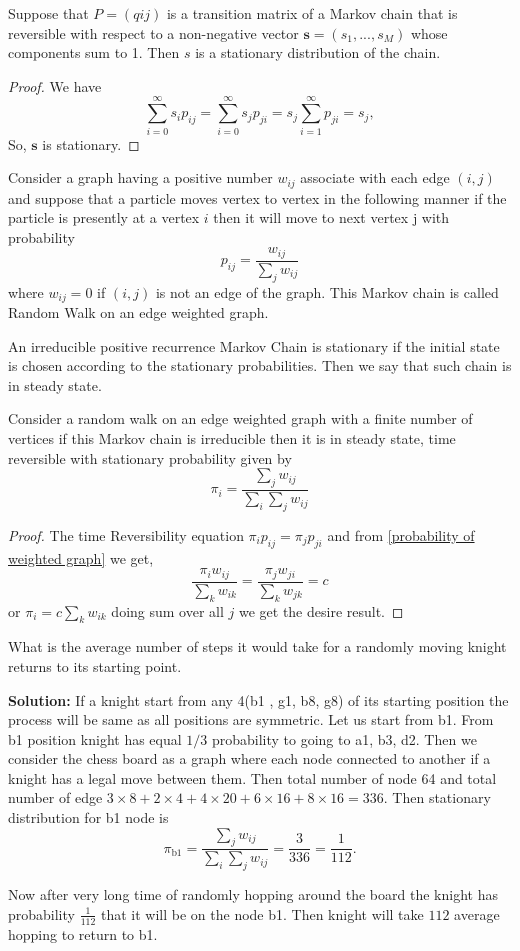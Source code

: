 \begin{proposition}
    Suppose that $P = (qij)$ is
a transition matrix of a Markov chain that is reversible with respect to a non-negative vector 
$\mathbf{s} = (s_1, . . . , s_M)$ whose components sum to 1. Then $s$ is a stationary distribution of the chain.
\end{proposition}
\begin{proof}
    We have 
    \[
        \sum_{i=0}^{\infty} s_{i}p_{ij} = \sum_{i=0}^{\infty} s_{j}p_{ji} = s_{j}\sum_{i=1}^{\infty} p_{ji} = s_{j},
    \]
    So, $ \mathbf{s} $ is stationary.
\end{proof}

Consider a graph having a positive number $ w_{ij} $ associate with each edge $ (i,j) $ and suppose that 
a particle moves vertex to vertex in the following manner if the particle is presently at a vertex  $ i $ then 
it will move to next vertex j with probability 
 \begin{equation}
    \label{probability of weighted graph}
    p_{ij} = \frac{w_{ij}}{\sum_j w_{ij}}
\end{equation}
where $ w_{ij} =0 $ if $ (i,j) $ is not an edge of the graph. This Markov chain is called 
Random Walk on an edge weighted graph.

An irreducible positive recurrence Markov Chain is stationary if the initial state is chosen according to the
stationary probabilities. Then we say that such chain is in steady state.

\begin{proposition}
    Consider a random walk on an edge weighted graph with a finite number of vertices if this Markov chain
    is irreducible then it is in steady state, time reversible with stationary probability given by
    \[
        \pi_{i} = \frac{\sum_{j}w_{ij}}{\sum_{i}\sum_{j}w_{ij}}
    \]
\end{proposition}
\begin{proof}
    The time Reversibility equation 
    $
        \pi_{i}p_{ij} = \pi_{j}p_{ji}
    $
    and from \cref{probability of weighted graph} we get,
    $$ \frac{\pi_{i}w_{ij}}{\sum_{k}w_{ik}} = \frac{\pi_{j}w_{ji}}{\sum_{k}w_{jk}} = c $$
    or $ \pi_{i} = c \sum_{k}w_{ik} $ doing sum over all $ j $ we get the desire result.
\end{proof}

\newpage
\begin{example}
    What is the average number of steps it would take for a randomly moving knight returns to its starting point.
\end{example}
\textbf{Solution: } If a knight start from any 4(b1 , g1, b8, g8) of its starting position the process will be same as all positions are symmetric.
Let us start from b1. From b1 position knight has equal $ 1/3 $ probability to going to  a1, b3, d2. Then we consider the chess board as a graph where 
each node connected to another if a knight has a legal move between them. Then total number of node 64 and total number of edge 
$ 3 \times 8 + 2 \times 4 + 4 \times 20 + 6 \times 16 + 8\times 16 =336 $. Then stationary distribution for b1 node is 
\[
    \pi_{\text{b1}} = \frac{\sum_{j}w_{ij} }{\sum_{i}\sum_{j}w_{ij}} = \frac{3}{336} = \frac{1}{112}.
\]

Now after very long time of randomly hopping around the board the knight has probability $ \frac{1}{112} $ that it will be on the node b1. 
Then knight will take  $ 112 $ average hopping to return to b1.

